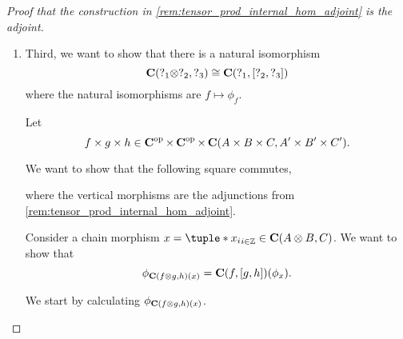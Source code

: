 \begin{proof}[Proof that the construction in \autoref{rem:tensor_prod_internal_hom_adjoint} is the adjoint]
\begin{enumerate}
{            By a similar argument, doing the reverse construction as above and going back again yields the same morphism, therefore \( f \mapsto \phi_f \) is a bijection.

            Finally, notice that every step of the construction is \( R \)-linear, therefore \( f \mapsto \phi_f \) is an isomorphism of modules.
        }
        \item {
            Third, we want to show that there is a natural isomorphism
            \[
                \operatorname{\mathbf{C}}(?_1 \otimes ?_2, ?_3) \cong \operatorname{\mathbf{C}}(?_1, \left[ ?_2, ?_3 \right])
            \]
            where the natural isomorphisms are \( f \mapsto \phi_f \).

            Let
            \[
                f \times g \times h \in \operatorname{\mathbf{C}}^{\operatorname{op}} \times \operatorname{\mathbf{C}}^{\operatorname{op}} \times \operatorname{\mathbf{C}} (A \times B \times C, A' \times B' \times C').
            \]

            We want to show that the following square commutes,
            \begin{center}
            \end{center}
            where the vertical morphisms are the adjunctions from \autoref{rem:tensor_prod_internal_hom_adjoint}.

            Consider a chain morphism \( x = \tuple*{x_i}_{i \in \Zb} \in \C(A \otimes B, C) \). We want to show that
            \[
                \phi_{\operatorname{\mathbf{C}}(f \otimes g, h) (x)} = \operatorname{\mathbf{C}}(f, [g, h]) (\phi_x).
            \]

            We start by calculating \( \phi_{\operatorname{\mathbf{C}}(f \otimes g, h) (x)} \).

}
\end{enumerate}
\end{proof}
